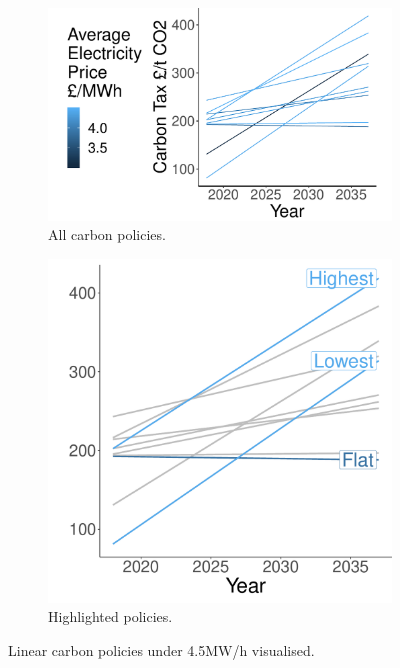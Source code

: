 \documentclass[sigconf]{acmart}
\begin{document}
\begin{figure}
\begin{subfigure}[h]{0.6\linewidth}
\includegraphics[width=\linewidth]{figures/results/linear_actual_lines}
\caption{All carbon policies.}
\label{fig:linear_actual_pdcs}
\end{subfigure}
\hfill
\begin{subfigure}[h]{0.39\linewidth}
\includegraphics[width=\linewidth]{figures/results/highlighted_linear_actual_lines}
\caption{Highlighted policies.}
\label{fig:highlighted_linear_actual_strategies}
\end{subfigure}%
\caption{Linear carbon policies under \textsterling4.5MW/h visualised.}
\end{figure}
\end{document}
